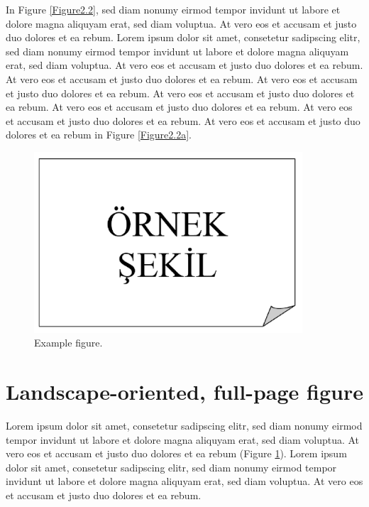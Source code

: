 
In Figure \ref{Figure2.2}, sed diam nonumy eirmod tempor invidunt ut labore et dolore magna aliquyam erat, sed diam voluptua. At vero eos et accusam et justo duo dolores et ea rebum. Lorem ipsum dolor sit amet, consetetur sadipscing elitr, sed diam nonumy eirmod tempor invidunt ut labore et dolore magna aliquyam erat, sed diam voluptua. At vero eos et accusam et justo duo dolores et ea rebum. At vero eos et accusam et justo duo dolores et ea rebum. At vero eos et accusam et justo duo dolores et ea rebum. At vero eos et accusam et justo duo dolores et ea rebum. At vero eos et accusam et justo duo dolores et ea rebum. At vero eos et accusam et justo duo dolores et ea rebum. At vero eos et accusam et justo duo dolores et ea rebum in Figure \ref{Figure2.2a}.

\begin{figure}
	\centering
	\includegraphics[width=10cm,keepaspectratio=true]{./fig/sekil2}
	\vspace{3pt}
	\caption{Example figure.}
	\label{Figure2.3}
\end{figure}
\vspace{-6pt}
\section{Landscape-oriented, full-page figure}

Lorem ipsum dolor sit amet, consetetur sadipscing elitr, sed diam nonumy eirmod tempor invidunt ut labore et dolore magna aliquyam erat, sed diam voluptua. At vero eos et accusam et justo duo dolores et ea rebum (Figure \ref{Figure2.3}). Lorem ipsum dolor sit amet, consetetur sadipscing elitr, sed diam nonumy eirmod tempor invidunt ut labore et dolore magna aliquyam erat, sed diam voluptua. At vero eos et accusam et justo duo dolores et ea rebum. 

